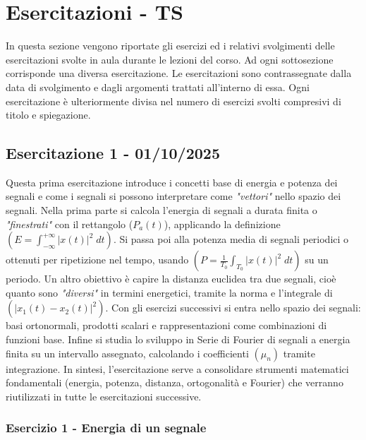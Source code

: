 \documentclass[../main.tex]{subfiles}
\begin{document}
\clearpage
\thispagestyle{empty}
\vspace*{7cm}
\section{Esercitazioni - TS}
\vspace*{1.5cm}

In questa sezione vengono riportate gli esercizi ed i relativi svolgimenti delle esercitazioni svolte in aula durante le lezioni del corso. Ad ogni sottosezione corrisponde una diversa esercitazione. Le esercitazioni sono contrassegnate dalla data di svolgimento e dagli argomenti trattati all'interno di essa. Ogni esercitazione è ulteriormente divisa nel numero di esercizi svolti compresivi di titolo e spiegazione.

\vspace*{1.5cm}
\subsection{Esercitazione 1 - 01/10/2025}


Questa prima esercitazione introduce i concetti base di energia e potenza dei segnali e come i segnali si possono interpretare come \textit{"vettori"} nello spazio dei segnali.
Nella prima parte si calcola l’energia di segnali a durata finita o \textit{"finestrati"} con il rettangolo ($P_a(t)$), applicando la definizione $(E = \int_{-\infty}^{+\infty}|x(t)|^2\;dt)$.
Si passa poi alla potenza media di segnali periodici o ottenuti per ripetizione nel tempo, usando $(P=\frac{1}{T_0}\int_{T_0}|x(t)|^2\;dt)$ su un periodo.
Un altro obiettivo è capire la distanza euclidea tra due segnali, cioè quanto sono \textit{"diversi"} in termini energetici, tramite la norma e l’integrale di $(|x_1(t)-x_2(t)|^2)$.
Con gli esercizi successivi si entra nello spazio dei segnali: basi ortonormali, prodotti scalari e rappresentazioni come combinazioni di funzioni base.
Infine si studia lo sviluppo in Serie di Fourier di segnali a energia finita su un intervallo assegnato, calcolando i coefficienti $(\mu_n)$ tramite integrazione.
In sintesi, l’esercitazione serve a consolidare strumenti matematici fondamentali (energia, potenza, distanza, ortogonalità e Fourier) che verranno riutilizzati in tutte le esercitazioni successive.

\vspace*{1cm}
\subsubsection{Esercizio 1 - Energia di un segnale}
\label{s11}
\end{document}
